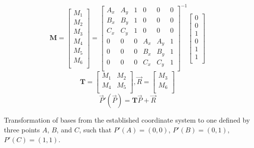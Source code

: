 \documentclass[12pt, letterpaper]{report}
\newcommand{\eq}[3]{
  \begin{eqn}[!htbp]
    #2
    \caption{#1}
    \label{#3}
  \end{eqn}
}
\begin{document}
\eq{Transformation of bases from the established coordinate system to one defined by three points $A$, $B$, and $C$, such that $P'(A)=(0,0)$, $P'(B)=(0,1)$, $P'(C)=(1,1)$.}{
  \[\mathbf{M}=\left[\begin{matrix}M_1\\M_2\\M_3\\M_4\\M_5\\M_6\\\end{matrix}\right]=\left[\begin{matrix}A_x&A_y&1&0&0&0\\B_x&B_y&1&0&0&0\\C_x&C_y&1&0&0&0\\0&0&0&A_x&A_y&1\\0&0&0&B_x&B_y&1\\0&0&0&C_x&C_y&1\\\end{matrix}\right]^{-1}\left[\begin{matrix}0\\0\\1\\0\\1\\1\\\end{matrix}\right]\]
  \[\mathbf{T}=\left[\begin{matrix}M_1&M_2\\M_4&M_5\\\end{matrix}\right],\vec{R}=\left[\begin{matrix}M_3\\M_6\\\end{matrix}\right]\]
  \[\vec{P}'(\vec{P})=\mathbf{T}\vec{P}+\vec{R}\]
}{eq:transform}
\end{document}
